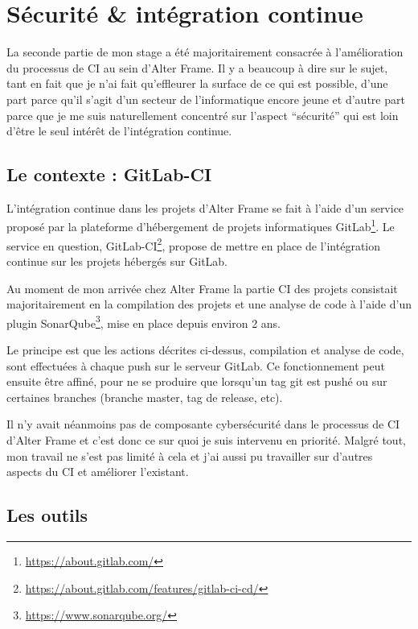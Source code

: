 \section{Sécurité \& intégration continue}
La seconde partie de mon stage a été majoritairement consacrée à l'amélioration du processus de CI au sein d'Alter Frame. Il y a beaucoup à dire sur le sujet, tant en fait que je n'ai fait qu'effleurer la surface de ce qui est possible, d'une part parce qu'il s'agit d'un secteur de l'informatique encore jeune et d'autre part parce que je me suis naturellement concentré sur l'aspect ``sécurité'' qui est loin d'être le seul intérêt de l'intégration continue.

\subsection{Le contexte : GitLab-CI}
L'intégration continue dans les projets d'Alter Frame se fait à l'aide d'un service proposé par la plateforme d'hébergement de projets informatiques GitLab\footnote{\url{https://about.gitlab.com/}}. Le service en question, GitLab-CI\footnote{\url{https://about.gitlab.com/features/gitlab-ci-cd/}}, propose de mettre en place de l'intégration continue sur les projets hébergés sur GitLab.

Au moment de mon arrivée chez Alter Frame la partie CI des projets consistait majoritairement en la compilation des projets et une analyse de code à l'aide d'un plugin SonarQube\footnote{\url{https://www.sonarqube.org/}}, mise en place depuis environ 2 ans.

Le principe est que les actions décrites ci-dessus, compilation et analyse de code, sont effectuées à chaque push sur le serveur GitLab. Ce fonctionnement peut ensuite être affiné, pour ne se produire que lorsqu'un tag git est pushé ou sur certaines branches (branche master, tag de release, etc).

Il n'y avait néanmoins pas de composante cybersécurité dans le processus de CI d'Alter Frame et c'est donc ce sur quoi je suis intervenu en priorité. Malgré tout, mon travail ne s'est pas limité à cela et j'ai aussi pu travailler sur d'autres aspects du CI et améliorer l'existant.

\subsection{Les outils}
